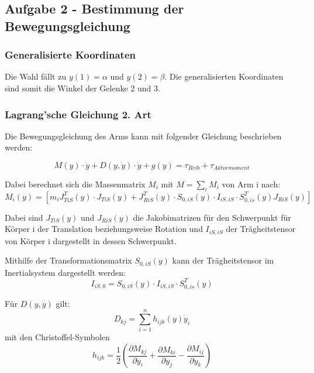 \subsection*{Aufgabe 2 - Bestimmung der Bewegungsgleichung}

\subsubsection*{Generalisierte Koordinaten}
Die Wahl fällt zu $y(1) = \alpha$ und $y(2) = \beta$. Die generalisierten Koordinaten sind somit die Winkel der Gelenke 2 und 3.

\subsubsection*{Lagrang'sche Gleichung 2. Art}
Die Bewegungsgleichung des Arms kann mit folgender Gleichung beschrieben werden:

\begin{equation}
	M(y) \cdot \ddot{y} + D(y,\dot{y}) \cdot \dot{y} + g(y) = \tau_{Reib} + \tau_{Aktormoment}
\end{equation}

Dabei berechnet sich die Massenmatrix $M_{i}$ mit $M = \sum_{i}{M_{i}}$ von Arm i nach:
\begin{equation}
	M_{i}(y) = \left[m_{i}J_{TiS}^{T}(y) \cdot J_{TiS}(y) + 
	J_{RiS}^{T}(y) \cdot S_{0,iS}(y) \cdot I_{iS,iS} \cdot S_{0,is}^{T}(y) J_{RiS}(y) \right]
\end{equation}

Dabei sind $J_{TiS}(y)$ und $J_{RiS}(y)$ die Jakobimatrizen für den Schwerpunkt für Körper 
i der Translation beziehungsweise Rotation und $I_{iS,iS}$
der Trägheitstensor von Körper i dargestellt in dessen Schwerpunkt.

Mithilfe der Transformationsmatrix $S_{0,iS}(y)$ kann der Trägheitstensor im Inertialsystem dargestellt werden:
\begin{equation}
	I_{iS,0} = S_{0,iS}(y) \cdot I_{iS,iS} \cdot S_{0,is}^{T}(y)
\end{equation}


Für  $D(y,\dot{y})$ gilt:
\begin{equation}
	D_{kj} = \sum_{i=1}^{n}h_{ijk}(y)\dot{y}_{i}
\end{equation}
mit den Christoffel-Symbolen
\begin{equation}
	h_{ijk} = \frac{1}{2}\left(	\frac{\partial M_{kj}}{\partial y_{i}} + 
								\frac{\partial M_{ki}}{\partial y_{j }} -
								\frac{\partial M_{ij}}{\partial y_{k}}				\right)
\end{equation}

